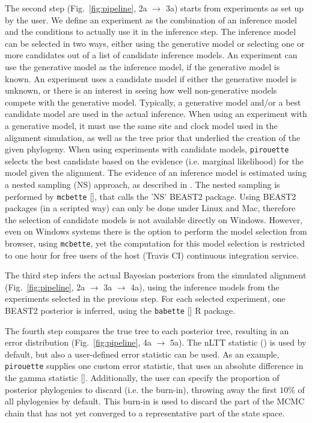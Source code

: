 \documentclass{article}
\begin{document}
The second step (Fig.~\ref{fig:pipeline}, 2a $\rightarrow$ 3a)
starts from experiments as set up by the user. 
We define an experiment as the combination of an inference model 
and the conditions to actually use it in the inference step.
The inference model can be selected in two ways, either using the
generative model or selecting one or more candidates out of a list of candidate inference models.
An experiment can use the generative model as the inference model, if the generative model is known.
An experiment uses a candidate model if either the generative model is unknown,
or there is an interest in seeing how well non-generative models compete with
the generative model.
Typically, a generative model and/or a best candidate model are used in the actual inference.
When using an experiment with a generative model,
it must use the same site and clock model used in the alignment simulation,
as well as the tree prior that underlied the creation of the given phylogeny. 
When using experiments with candidate models,
\verb;pirouette; selects the best candidate based
on the evidence (i.e. marginal likelihood) for the model given the alignment.
The evidence of an inference model is estimated using a nested sampling (NS)
approach, as described in \cite{maturana2018model}. The nested sampling is
performed by \verb;mcbette; [\cite{mcbette}], that calls the 'NS' BEAST2 package. 
Using BEAST2 packages (in a scripted way) can only be done under Linux and Mac,
therefore the selection of candidate models is not available directly on Windows. 
However, even on Windows systems there is the option to perform the model selection from browser, using \verb;mcbette;, yet the computation for this model selection is
restricted to one hour for free users of the host (Travis CI) continuous
integration service.

The third step infers the actual Bayesian posteriors from the simulated 
alignment (Fig.~\ref{fig:pipeline}, 2a $\rightarrow$ 3a $\rightarrow$ 4a),
using the inference models from the experiments selected in the previous step. For each selected experiment, one BEAST2 posterior is inferred, using the \verb;babette; [\cite{bilderbeek2018babette}] R package.

The fourth step compares the true tree to each posterior tree, resulting in an error distribution (Fig.~\ref{fig:pipeline}, 4a $\rightarrow$ 5a).
The nLTT statistic (\cite{janzen2015approximate}) is used by default, but also a user-defined error statistic can be used. 
As an example, \verb;pirouette; supplies one custom error statistic,
that uses an absolute difference in the gamma statistic [\cite{pybus2000testing}].
Additionally, the user can specify the proportion of posterior phylogenies to 
discard (i.e. the burn-in), throwing away the first $10\%$
of all phylogenies by default. This burn-in is used to discard
the part of the MCMC chain that has not yet converged to a
representative part of the state space.
\end{document}
